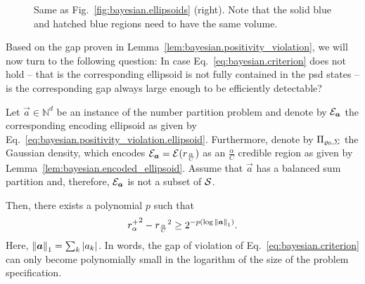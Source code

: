 \begin{figure}[t]
  \centering
  
  \caption{\label{fig:bayesian.r_separation}
    Same as Fig.~\ref{fig:bayesian.ellipsoids} (right).
    Note that the solid blue and hatched blue regions need to have the same volume.
  }
\end{figure}


Based on the gap proven in Lemma~\ref{lem:bayesian.positivity_violation}, we will now turn to the following question:
In case Eq.~\eqref{eq:bayesian.criterion} does not hold -- that is the corresponding ellipsoid is not fully contained in the psd states -- is the corresponding gap always large enough to be efficiently detectable?
\begin{lemma}\label{lem:bayesian.r_separation}
   Let $\vec a \in \mathbb{N}^d$ be an instance of the number partition problem and denote by $\mathcal{E}_{{\boldsymbol{a}}}$ the corresponding encoding ellipsoid as given by Eq.~\eqref{eq:bayesian.positivity_violation.ellipsoid}.
  Furthermore, denote by $\Pi_{\varrho_0,\Sigma}$ the Gaussian density, which encodes $\mathcal{E}_{{\boldsymbol{a}}} = \mathcal{E}(r_\frac{\alpha}{C})$ as an $\frac{\alpha}{C}$ credible region as given by Lemma~\ref{lem:bayesian.encoded_ellipsoid}.
  Assume that $\vec a$ has a balanced sum partition and, therefore, $\mathcal{E}_{{\boldsymbol{a}}}$ is not a subset of $\mathcal{S}$.

  Then, there exists a polynomial $p$ such that
  \[
    {r^+_{\alpha}}^2 - {r_\frac{\alpha}{C}}^2 \ge 2^{-p(\log {\Vert{\boldsymbol{a}}\Vert}_1)}.
  \]
  Here, ${\Vert{\boldsymbol{a}}\Vert}_1 = \sum_k {\vert a_k\vert}$.
  In words, the gap of violation of Eq.~\eqref{eq:bayesian.criterion} can only become polynomially small in the logarithm of the size of the problem specification.
\end{lemma}

